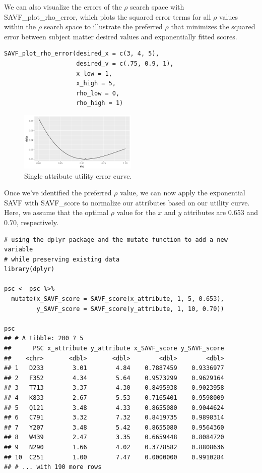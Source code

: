 \documentclass[twocolumn]{svjour3}       %
\begin{document}
We can also visualize the errors of the $\rho$ search space with SAVF\_plot\_rho\_error, which plots the squared error terms for all $\rho$ values within the $\rho$ search space to illustrate the preferred $\rho$ that minimizes the squared error between subject matter desired values and exponentially fitted scores.
\begin{verbatim}
SAVF_plot_rho_error(desired_x = c(3, 4, 5),
                    desired_v = c(.75, 0.9, 1),
                    x_low = 1,
                    x_high = 5,
                    rho_low = 0,
                    rho_high = 1)
\end{verbatim}

\begin{figure}[!htb]
  \includegraphics[width=0.5\textwidth]{fig4.png}
  \caption{Single attribute utility error curve.}
  \label{fig:4}
\end{figure}

Once we've identified the preferred $\rho$ value, we can now apply the exponential SAVF with SAVF\_score to normalize our attributes based on our utility curve. Here, we assume that the optimal $\rho$ value for the $x$ and $y$ attributes are 0.653 and 0.70, respectively.
\begin{verbatim}
# using the dplyr package and the mutate function to add a new variable 
# while preserving existing data
library(dplyr)

psc <- psc %>%
  mutate(x_SAVF_score = SAVF_score(x_attribute, 1, 5, 0.653),
         y_SAVF_score = SAVF_score(y_attribute, 1, 10, 0.70))

psc
## # A tibble: 200 ? 5
##      PSC x_attribute y_attribute x_SAVF_score y_SAVF_score
##    <chr>       <dbl>       <dbl>        <dbl>        <dbl>
## 1   D233        3.01        4.84    0.7887459    0.9336977
## 2   F352        4.34        5.64    0.9573299    0.9629164
## 3   T713        3.37        4.30    0.8495938    0.9023958
## 4   K833        2.67        5.53    0.7165401    0.9598009
## 5   Q121        3.48        4.33    0.8655080    0.9044624
## 6   C791        3.32        7.32    0.8419735    0.9898314
## 7   Y207        3.48        5.42    0.8655080    0.9564360
## 8   W439        2.47        3.35    0.6659448    0.8084720
## 9   N290        1.66        4.02    0.3778582    0.8808636
## 10  C251        1.00        7.47    0.0000000    0.9910284
## # ... with 190 more rows
\end{verbatim}
\end{document}
